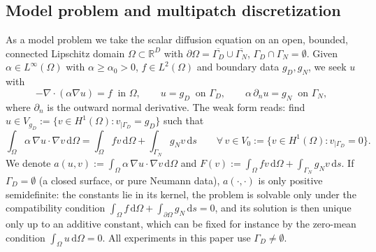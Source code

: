 \documentclass{article}
\newcommand{\R}{\mathbb{R}}
\theoremstyle{plain}
\numberwithin{equation}{section}
\begin{document}
\subsection{Model problem and multipatch discretization} \label{subsec:model}

As a model problem we take the scalar diffusion equation on an open, bounded,
connected Lipschitz domain $\Omega \subset \R^{D}$ with $\partial\Omega =
    \overline{\Gamma_D} \cup \overline{\Gamma_N}$, $\Gamma_D \cap \Gamma_N =
    \emptyset$. Given $\alpha \in L^\infty(\Omega)$ with $\alpha \ge \alpha_0 > 0$,
$f \in L^2(\Omega)$ and boundary data $g_D, g_N$, we seek $u$ with
\begin{equation}
    -\nabla \cdot (\alpha \nabla u) = f \ \text{ in } \Omega,
    \qquad u = g_D \ \text{ on } \Gamma_D,
    \qquad \alpha\, \partial_n u = g_N \ \text{ on } \Gamma_N,
    \label{eq:poisson-strong}
\end{equation}
where $\partial_n$ is the outward normal derivative.
The weak form reads: find $u \in V_{g_D} := \{ v \in H^1(\Omega) : v_{|\Gamma_D}
    = g_D \}$ such that
\begin{equation}
    \int_{\Omega} \alpha\, \nabla u \cdot \nabla v\,\mathrm{d}\Omega = \int_{\Omega} f v \,\mathrm{d}\Omega + \int_{\Gamma_N} g_N v
    \,\mathrm{d}s \qquad \forall\, v \in V_0 := \{ v \in H^1(\Omega) :
    v_{|\Gamma_D} = 0 \}.
    \label{eq:weak-form}
\end{equation}
We denote $a(u, v) := \int_{\Omega} \alpha\, \nabla u \cdot \nabla v\,\mathrm{d}\Omega$
and $F(v) := \int_{\Omega} f v \,\mathrm{d}\Omega + \int_{\Gamma_N} g_N v
    \,\mathrm{d}s$. If $\Gamma_D = \emptyset$ (a closed surface, or pure Neumann
data), $a(\cdot,\cdot)$ is only positive semidefinite: the constants lie in its
kernel, the problem is solvable only under the compatibility condition
$\int_\Omega f \,\mathrm{d}\Omega + \int_{\partial\Omega} g_N \,\mathrm{d}s = 0$,
and its solution is then unique only up to an additive constant, which can be
fixed for instance by the zero-mean condition $\int_\Omega u
    \,\mathrm{d}\Omega = 0$.  All experiments in this paper use
$\Gamma_D \neq \emptyset$.
\end{document}
